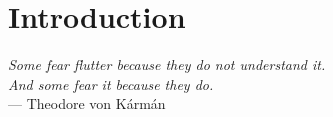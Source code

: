 \chapter{Introduction}\label{chap:intro}

\textit{Some fear flutter because they do not understand it.}\\
\textit{And some fear it because they do.} \vspace{5pt} \\
--- Theodore von K\'arm\'an \\

\noindent \lipsum[3-8]
